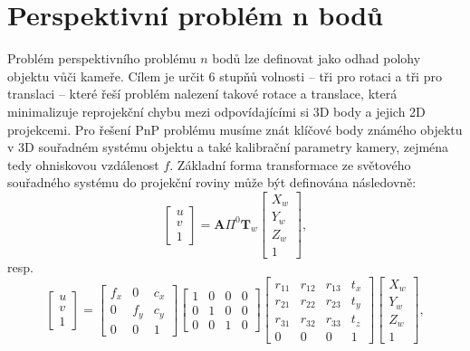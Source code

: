 \section{Perspektivní problém n bodů}
\label{sec:Chapter22}
Problém perspektivního problému $n$ bodů lze definovat jako odhad polohy objektu vůči kameře. Cílem je určit 6 stupňů volnosti -- tři pro rotaci a tři pro translaci -- které řeší problém nalezení takové rotace a translace, která minimalizuje reprojekční chybu mezi odpovídajícími si 3D body a jejich 2D projekcemi. Pro řešení PnP problému musíme znát klíčové body známého objektu v 3D souřadném systému objektu a také kalibrační parametry kamery, zejména tedy ohniskovou vzdálenost $f$. Základní forma transformace ze světového souřadného systému do projekční roviny může být definována následovně:
\begin{equation}
\begin{bmatrix} u \\ v \\ 1 \end{bmatrix} = \mathbf{A} \Pi^0 \mathbf{T}_w \begin{bmatrix} X_w \\ Y_w \\ Z_w \\ 1 \end{bmatrix},
\end{equation}
resp.
\begin{equation}
    \begin{bmatrix} u \\ v \\ 1 \end{bmatrix} = \begin{bmatrix} f_x & 0 & c_x \\ 0 & f_y & c_y \\ 0 & 0 & 1 \end{bmatrix} \begin{bmatrix} 1 & 0 & 0 & 0 \\ 0 & 1 & 0 & 0 \\ 0 & 0 & 1 & 0 \end{bmatrix} \begin{bmatrix} r_{11} & r_{12} & r_{13} & t_x \\ r_{21} & r_{22} & r_{23} & t_y \\ r_{31} & r_{32} & r_{33} & t_z \\ 0 & 0 & 0 & 1 \end{bmatrix} \begin{bmatrix} X_w \\ Y_w \\ Z_w \\ 1 \end{bmatrix},
\end{equation}
